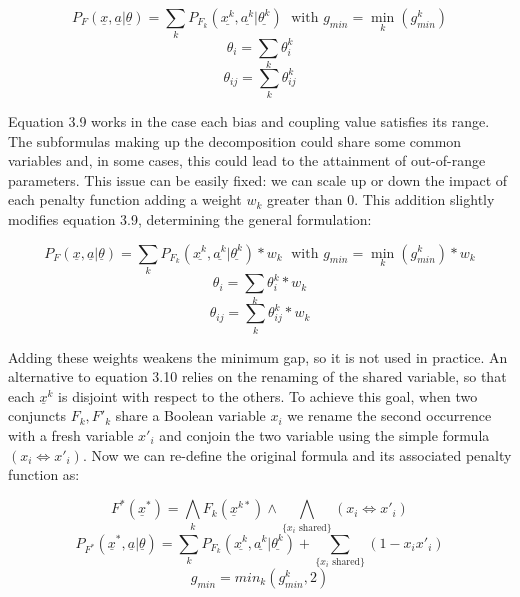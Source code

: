 \begin{equation*}
    P_{F}(\underline{x},\underline{a}|\underline{\theta}) = \sum_k P_{F_k}(\underline{x^k},\underline{a^k}|\underline{\theta^k}) \; \textrm{        with        } g_{min} = \min_k(g^k_{min})
\end{equation*}
\begin{equation}
    \theta_i = \sum_k \theta^k_i
\end{equation}
\begin{equation*}
    \theta_{ij} = \sum_k \theta^k_{ij}
\end{equation*}

Equation 3.9 works in the case each bias and coupling value satisfies its range. The subformulas making up the decomposition could share some common variables and, in some cases, this could lead to the attainment of out-of-range parameters. This issue can be easily fixed: we can scale up or down the impact of each penalty function adding a weight $w_k$ greater than 0. This addition slightly modifies equation 3.9, determining the general formulation:

\begin{equation*}
    P_{F}(\underline{x},\underline{a}|\underline{\theta}) = \sum_k P_{F_k}(\underline{x^k},\underline{a^k}|\underline{\theta^k})*w_k \; \textrm{        with        } g_{min} = \min_k(g^k_{min})*w_k
\end{equation*}
\begin{equation}
    \theta_i = \sum_k \theta^k_i*w_k
\end{equation}
\begin{equation*}
    \theta_{ij} = \sum_k \theta^k_{ij}*w_k
\end{equation*}

Adding these weights weakens the minimum gap, so it is not used in practice. An alternative to equation 3.10 relies on the renaming of the shared variable, so that each $\underline{x}^k$ is disjoint with respect to the others. To achieve this goal, when two conjuncts $F_k, F'_k$ share a Boolean variable $x_i$ we rename the second occurrence with a fresh variable $x'_i$ and conjoin the two variable using the simple formula $(x_i \iff x'_i)$. Now we can re-define the original formula and its associated penalty function as:

\begin{equation*}
    F^*(\underline{x}^*) = \bigwedge_k F_k(\underline{x}^{k*}) \land \bigwedge_{\{ x_i \textrm{  shared}\}} (x_i \iff x'_i) 
\end{equation*}
\begin{equation}
    P_{F^*}(\underline{x}^*,\underline{a}|\underline{\theta}) = \sum_k P_{F_k}(\underline{x^k},\underline{a^k}|\underline{\theta^k}) + \sum_{\{ x_i \textrm{  shared}\}} (1 - x_ix'_i)
\end{equation}
\begin{equation*}
    g_{min} = min_k(g^k_{min},2)
\end{equation*}

